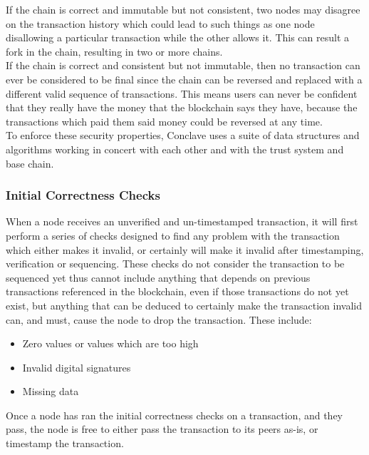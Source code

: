 \documentclass{report}
\begin{document}
				If the chain is correct and immutable but not consistent, two nodes may disagree on the transaction history which could lead to such things as one node disallowing a particular transaction while the other allows it. This can result a fork in the chain, resulting in two or more chains. \\

				If the chain is correct and consistent but not immutable,  then no transaction can ever be considered to be final  since the chain can be reversed and replaced with a different valid sequence of transactions. This means users can never be confident that they really have the money that the blockchain says they have, because the transactions which paid them said money could be reversed at any time. \\

				To enforce these security properties, Conclave uses a suite of data structures and algorithms working in concert with each other and with the trust system and base chain.
			\subsubsection{Initial Correctness Checks}
				When a node receives an unverified and un-timestamped  transaction, it will first perform a series of checks designed to find any problem with the transaction which either makes it invalid, or certainly will make it invalid after timestamping, verification or sequencing. These checks do not consider the transaction to be sequenced  yet thus cannot include anything that depends on previous transactions referenced in the blockchain, even if those transactions do not yet exist, but anything that can be deduced to certainly make the transaction invalid can, and must, cause the node to drop the transaction. These include:

				\begin{itemize}
					\item Zero values or values which are too high
					\item Invalid digital signatures 
					\item Missing data
				\end{itemize}

				Once a node has ran the initial correctness checks on a transaction, and they pass, the node is free to either pass the transaction to its peers as-is, or timestamp the transaction.
\end{document}

